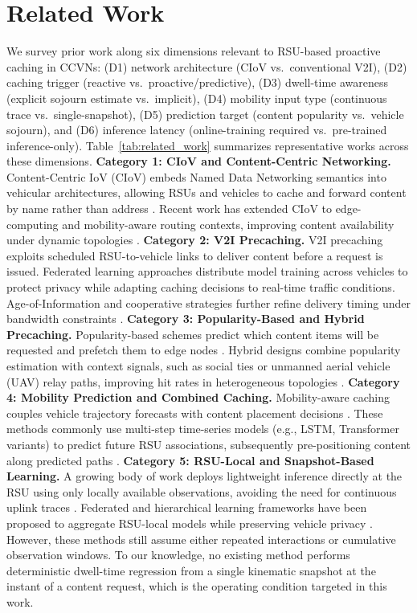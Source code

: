 \documentclass[journal]{IEEEtran}
\begin{document}
\section{Related Work}\label{sec:related}

We survey prior work along six dimensions relevant to RSU-based proactive caching in CCVNs:
(D1) network architecture (CIoV vs.\ conventional V2I),
(D2) caching trigger (reactive vs.\ proactive/predictive),
(D3) dwell-time awareness (explicit sojourn estimate vs.\ implicit),
(D4) mobility input type (continuous trace vs.\ single-snapshot),
(D5) prediction target (content popularity vs.\ vehicle sojourn),
and (D6) inference latency (online-training required vs.\ pre-trained inference-only).
Table~\ref{tab:related_work} summarizes representative works across these dimensions.
\textbf{Category 1: CIoV and Content-Centric Networking.}
Content-Centric IoV (CIoV) embeds Named Data Networking semantics into vehicular architectures,
allowing RSUs and vehicles to cache and forward content by name rather than address \cite{1,3,5}.
Recent work has extended CIoV to edge-computing and mobility-aware routing contexts,
improving content availability under dynamic topologies \cite{8,10,11}.
\textbf{Category 2: V2I Precaching.}
V2I precaching exploits scheduled RSU-to-vehicle links to deliver content before a request is issued.
Federated learning approaches \cite{17,18,20} distribute model training across vehicles to protect privacy
while adapting caching decisions to real-time traffic conditions.
Age-of-Information and cooperative strategies further refine delivery timing under bandwidth constraints \cite{15}.
\textbf{Category 3: Popularity-Based and Hybrid Precaching.}
Popularity-based schemes predict which content items will be requested and prefetch them to edge nodes \cite{32,33,34}.
Hybrid designs combine popularity estimation with context signals, such as social ties or unmanned aerial vehicle (UAV) relay paths,
improving hit rates in heterogeneous topologies \cite{47,48,49}.
\textbf{Category 4: Mobility Prediction and Combined Caching.}
Mobility-aware caching couples vehicle trajectory forecasts with content placement decisions \cite{39,42,43}.
These methods commonly use multi-step time-series models (e.g., LSTM, Transformer variants) to predict
future RSU associations, subsequently pre-positioning content along predicted paths \cite{41,45}.
\textbf{Category 5: RSU-Local and Snapshot-Based Learning.}
A growing body of work deploys lightweight inference directly at the RSU using only locally available
observations, avoiding the need for continuous uplink traces \cite{64,68,71}.
Federated and hierarchical learning frameworks have been proposed to aggregate RSU-local models
while preserving vehicle privacy \cite{60,61,67}.
However, these methods still assume either repeated interactions or cumulative observation windows.
To our knowledge, no existing method performs deterministic dwell-time regression from a single kinematic snapshot at the instant of a content request, which is the operating condition targeted in this work.
\end{document}
